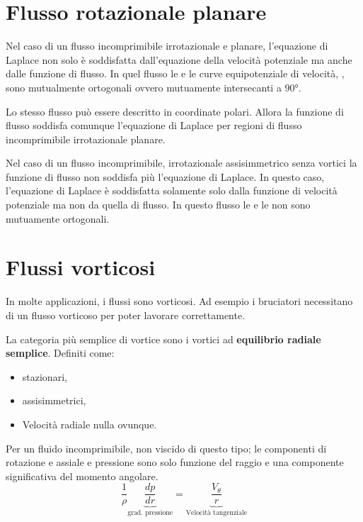 \section{Flusso rotazionale planare}
Nel caso di un flusso incomprimibile irrotazionale e planare, l'equazione di Laplace non solo è soddisfatta dall'equazione della velocità potenziale ma anche dalle funzione di flusso.
In quel flusso le  e le curve equipotenziale di velocità, , sono mutualmente ortogonali ovvero mutuamente intersecanti a $90\unit{\degree}$.

Lo stesso flusso può essere descritto in coordinate polari.
Allora la funzione di flusso soddisfa comunque l'equazione di Laplace per regioni di flusso incomprimibile irrotazionale planare.

Nel caso di un flusso incomprimibile, irrotazionale assisimmetrico senza vortici la funzione di flusso non soddisfa più l'equazione di Laplace.
In questo caso, l'equazione di Laplace è soddisfatta solamente solo dalla funzione di velocità potenziale ma non da quella di flusso.
In questo flusso le  e le  non sono mutuamente ortogonali.

\section{Flussi vorticosi}
In molte applicazioni, i flussi sono vorticosi. Ad esempio i bruciatori necessitano di un flusso vorticoso per poter lavorare correttamente.

La categoria più semplice di vortice sono i vortici ad \textbf{equilibrio radiale semplice}. Definiti come:
\begin{itemize}
\item stazionari,
\item assisimmetrici,
\item Velocità radiale nulla ovunque.
\end{itemize}
Per un fluido incomprimibile, non viscido di questo tipo; le componenti di rotazione e assiale e pressione sono solo funzione del raggio e una componente significativa del momento angolare.
\begin{equation}
\frac{1}{\rho} \underbrace{\frac{dp}{dr}}_{\text{grad. pressione}} = \underbrace{\frac{V_{\theta}}{r}}_{\text{Velocità tangenziale}}
\label{eqn:EqRadSemplice}
\end{equation}


